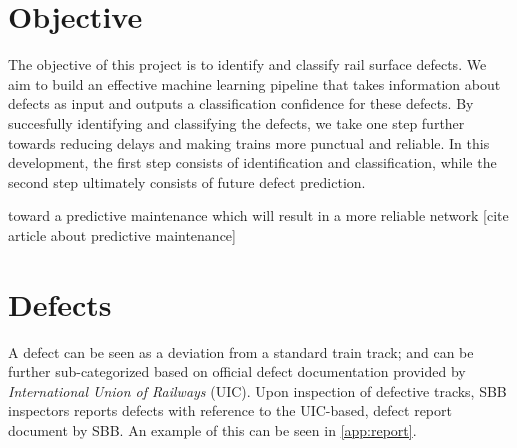 \section{Objective}
The objective of this project is to identify and classify rail surface defects. We aim to build an effective machine learning pipeline that takes information about defects as input and outputs a classification confidence for these defects. By succesfully identifying and classifying the defects, we take one step further towards reducing delays and making trains more punctual and reliable. In this development, the first step consists of identification and classification, while the second step ultimately consists of future defect prediction. 

toward a predictive maintenance which will result in a more reliable network [cite article about predictive maintenance]
\section{Defects}
A defect can be seen as a deviation from a standard train track; and can be further sub-categorized based on official defect documentation \cite{rail:online} provided by \textit{International Union of Railways} (UIC). Upon inspection of defective tracks, SBB inspectors reports defects with reference to the UIC-based, defect report document by SBB. An example of this can be seen in \ref{app:report}.

